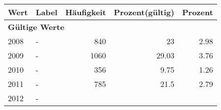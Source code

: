      \begin{longtable}{lXrrr}
     \toprule
     \textbf{Wert} & \textbf{Label} & \textbf{Häufigkeit} & \textbf{Prozent(gültig)} & \textbf{Prozent} \\
     \endhead
     \midrule
     \multicolumn{5}{l}{\textbf{Gültige Werte}}\\

     2008 &
     \multicolumn{1}{X}{ -  } &


       \num{840} &
       \num[round-mode=places,round-precision=2]{23} &
         \num[round-mode=places,round-precision=2]{2,98} \\

     2009 &
     \multicolumn{1}{X}{ -  } &


       \num{1060} &
       \num[round-mode=places,round-precision=2]{29,03} &
         \num[round-mode=places,round-precision=2]{3,76} \\

     2010 &
     \multicolumn{1}{X}{ -  } &


       \num{356} &
       \num[round-mode=places,round-precision=2]{9,75} &
         \num[round-mode=places,round-precision=2]{1,26} \\

     2011 &
     \multicolumn{1}{X}{ -  } &


       \num{785} &
       \num[round-mode=places,round-precision=2]{21,5} &
         \num[round-mode=places,round-precision=2]{2,79} \\

     2012 &
     \multicolumn{1}{X}{ -  } &



\end{longtable}
